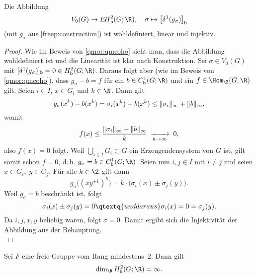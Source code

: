 \begin{thProposition}
    \label{freep:qmtocoho}%
    Die Abbildung
    \[ V_0(G) \to \EHb^2(G;\R), \quad
        \sigma \mapsto \bigl[\delta^1(g_\sigma)\bigr]_\bd
    \]
    (mit $g_\sigma$ aus \cref{freep:construction})
    ist wohldefiniert, linear und injektiv.
\end{thProposition}

\begin{proof}
    Wie im Beweis von \cref{qmor:qmcoho} sieht man, dass die Abbildung
    wohldefiniert ist und die Linearität ist klar nach Konstruktion.
    Sei $\sigma\in V_0(G)$ mit
    $[\delta^1(g_\sigma)]_\bd = 0 \in\Hb^2(G;\R)$. Daraus folgt aber
    (wie im Beweis von \cref{qmor:qmcoho}), dass $g_\sigma - b = f$
    für ein $b\in\Cb^1(G;\R)$ und ein $f\in\Hom_\Z(G,\R)$ gilt. Seien
    $i\in I$, $x\in G_i$ und $k\in\N$. Dann gilt
    \[ g_\sigma(x^k) - b(x^k) = \sigma_i(x^k) - b(x^k) 
        \leq \lVert\sigma_i\rVert_\infty + \lVert b\rVert_\infty
    , \]
    womit
    \[ f(x) \leq \frac{\lVert\sigma_i\rVert_\infty + \lVert b\rVert_\infty}{k}
        \;\xrightarrow[k\to\infty]{}\; 0
    , \]
    also $f(x) = 0$ folgt. Weil $\bigcup_{i\in I} G_i \subset G$ ein
    Erzeugendensystem von $G$ ist, gilt somit schon $f=0$, d.\,h.
    $g_\sigma = b \in\Cb^1(G;\R)$. Seien nun $i,j\in I$ mit $i\neq j$ und
    seien $x\in G_i,\; y\in G_j$. Für alle $k\in\Z$ gilt dann
    \[ g_\sigma\bigl( (xy^{\pm1})^k \bigr)
        = k\cdot \bigl( \sigma_i(x) \pm \sigma_j(y) \bigr)
    . \]
    Weil $g_\sigma = b$ beschränkt ist, folgt 
    \[ \sigma_i(x) \pm \sigma_j(y) = 0
        \qtextq{und daraus}
        \sigma_i(x) = 0 = \sigma_j(y)
    . \]
    Da $i,j,x,y$ beliebig waren, folgt $\sigma = 0$. Damit ergibt sich
    die Injektivität der Abbildung aus der Behauptung.
    \\
\end{proof}

\begin{thKorollar}
    \label{freep:cohofreegrp}%
    Sei $F$ eine freie Gruppe vom Rang mindestens~$2$. Dann gilt
    \[ \dim_{\R} \Hb^2(G;\R) = \infty  . \]
\end{thKorollar}

